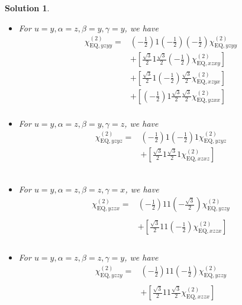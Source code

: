 \documentclass[UTF8,10pt,a4paper]{article}
\theoremstyle{Problem}
\theoremstyle{Solution}
\newtheorem*{sol}{Solution}
\begin{document}
\begin{sol}
\begin{itemize}
\begin{align}
&
\end{align}\normalsize
\item For $u=y,\alpha=z,\beta=y,\gamma=y$, we have
\footnotesize\begin{align}
\nonumber\chi_{\text{EQ},yzyy}^{(2)}=&\left(-\frac{1}{2}\right)1\left(-\frac{1}{2}\right)\left(-\frac{1}{2}\right)\chi_{\text{EQ},yzyy}^{(2)}\\
\nonumber&+\left[\frac{\sqrt{3}}{2}1\frac{\sqrt{3}}{2}\left(-\frac{1}{2}\right)\chi_{\text{EQ},xzxy}^{(2)}\right]\\
\nonumber&+\left[\frac{\sqrt{3}}{2}1\left(-\frac{1}{2}\right)\frac{\sqrt{3}}{2}\chi_{\text{EQ},xzyx}^{(2)}\right]\\
\nonumber&+\left[\left(-\frac{1}{2}\right)1\frac{\sqrt{3}}{2}\frac{\sqrt{3}}{2}\chi_{\text{EQ},yzxx}^{(2)}\right]\\
&
\end{align}\normalsize
\item For $u=y,\alpha=z,\beta=y,\gamma=z$, we have
\footnotesize\begin{align}
\nonumber\chi_{\text{EQ},yzyz}^{(2)}=&\left(-\frac{1}{2}\right)1\left(-\frac{1}{2}\right)1\chi_{\text{EQ},yzyz}^{(2)}\\
\nonumber&+\left[\frac{\sqrt{3}}{2}1\frac{\sqrt{3}}{2}1\chi_{\text{EQ},xzxz}^{(2)}\right]\\
\nonumber&\\
\nonumber&\\
&
\end{align}\normalsize
\item For $u=y,\alpha=z,\beta=z,\gamma=x$, we have
\footnotesize\begin{align}
\nonumber\chi_{\text{EQ},yzzx}^{(2)}=&\left(-\frac{1}{2}\right)11\left(-\frac{\sqrt{3}}{2}\right)\chi_{\text{EQ},yzzy}^{(2)}\\
\nonumber&\\
\nonumber&+\left[\frac{\sqrt{3}}{2}11\left(-\frac{1}{2}\right)\chi_{\text{EQ},xzzx}^{(2)}\right]\\
\nonumber&\\
&
\end{align}\normalsize
\item For $u=y,\alpha=z,\beta=z,\gamma=y$, we have
\footnotesize\begin{align}
\nonumber\chi_{\text{EQ},yzzy}^{(2)}=&\left(-\frac{1}{2}\right)11\left(-\frac{1}{2}\right)\chi_{\text{EQ},yzzy}^{(2)}\\
\nonumber&\\
\nonumber&+\left[\frac{\sqrt{3}}{2}11\frac{\sqrt{3}}{2}\chi_{\text{EQ},xzzx}^{(2)}\right]\\

\end{align}
\end{itemize}
\end{sol}
\end{document}

